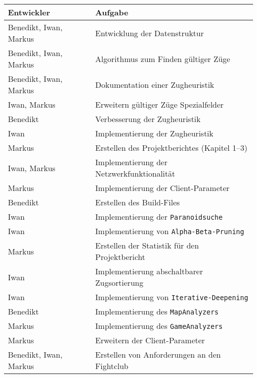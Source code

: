 \newpage

\vspace{1em}
\begin{table}[!h]
    \centering
    \begin{tabular}{|l|l|}
        \hline
        \textbf{Entwickler} & \textbf{Aufgabe} \\
        \hline
        Benedikt, Iwan, Markus & Entwicklung der Datenstruktur\\
        \hline
        Benedikt, Iwan, Markus & Algorithmus zum Finden g\"ultiger Z\"uge \\
        \hline
        Benedikt, Iwan, Markus & Dokumentation einer Zugheuristik \\
        \hline
        Iwan, Markus & Erweitern g\"ultiger Z\"uge Spezialfelder  \\
        \hline
        Benedikt & Verbesserung der Zugheuristik \\
        \hline
        Iwan & Implementierung der Zugheuristik \\
        \hline
        Markus & Erstellen des Projektberichtes (Kapitel 1--3) \\
        \hline
        Iwan, Markus & Implementierung der Netzwerkfunktionalit\"at \\
        \hline
        Markus & Implementierung der Client-Parameter \\
        \hline
        Benedikt & Erstellen des Build-Files \\
        \hline
        Iwan & Implementierung der \texttt{Paranoidsuche} \\
        \hline
        Iwan & Implementierung von \texttt{Alpha-Beta-Pruning} \\
        \hline
        Markus & Erstellen der Statistik f\"ur den Projektbericht \\
        \hline
        Iwan & Implementierung abschaltbarer Zugsortierung \\
        \hline
        Iwan & Implementierung von \texttt{Iterative-Deepening} \\
        \hline
        Benedikt & Implementierung des \texttt{MapAnalyzers} \\
        \hline
        Markus & Implementierung des \texttt{GameAnalyzers} \\
        \hline
        Markus & Erweitern der Client-Parameter \\
        \hline
        Benedikt, Iwan, Markus & Erstellen von Anforderungen an den Fightclub \\

\end{tabular}
\end{table}

